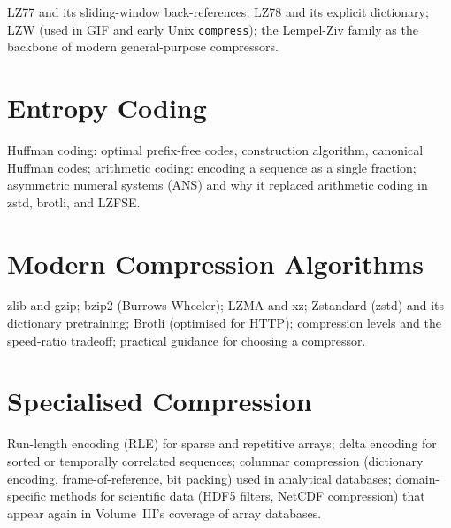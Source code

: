 LZ77 and its sliding-window back-references; LZ78 and its explicit
dictionary; LZW (used in GIF and early Unix \texttt{compress}); the
Lempel-Ziv family as the backbone of modern general-purpose compressors.

\chapter{Entropy Coding}
\label{ch:entropy-coding}

Huffman coding: optimal prefix-free codes, construction algorithm, canonical
Huffman codes; arithmetic coding: encoding a sequence as a single fraction;
asymmetric numeral systems (ANS) and why it replaced arithmetic coding in
zstd, brotli, and LZFSE.

\chapter{Modern Compression Algorithms}
\label{ch:modern-compression}

zlib and gzip; bzip2 (Burrows-Wheeler); LZMA and xz; Zstandard (zstd) and
its dictionary pretraining; Brotli (optimised for HTTP); compression levels
and the speed-ratio tradeoff; practical guidance for choosing a compressor.

\chapter{Specialised Compression}
\label{ch:specialised-compression}

Run-length encoding (RLE) for sparse and repetitive arrays; delta encoding
for sorted or temporally correlated sequences; columnar compression
(dictionary encoding, frame-of-reference, bit packing) used in analytical
databases; domain-specific methods for scientific data (HDF5 filters, NetCDF
compression) that appear again in Volume~III's coverage of array databases.